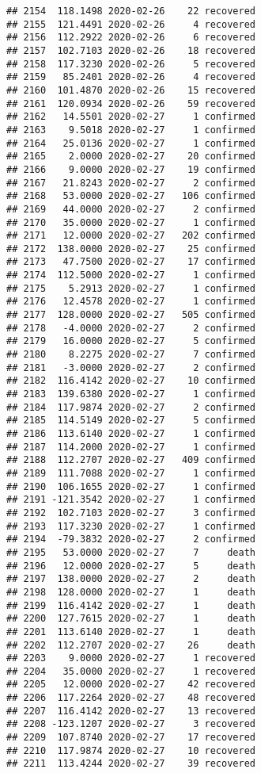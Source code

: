 \documentclass[
]{article}
\begin{document}
\begin{verbatim}
## 2154  118.1498 2020-02-26    22 recovered
## 2155  121.4491 2020-02-26     4 recovered
## 2156  112.2922 2020-02-26     6 recovered
## 2157  102.7103 2020-02-26    18 recovered
## 2158  117.3230 2020-02-26     5 recovered
## 2159   85.2401 2020-02-26     4 recovered
## 2160  101.4870 2020-02-26    15 recovered
## 2161  120.0934 2020-02-26    59 recovered
## 2162   14.5501 2020-02-27     1 confirmed
## 2163    9.5018 2020-02-27     1 confirmed
## 2164   25.0136 2020-02-27     1 confirmed
## 2165    2.0000 2020-02-27    20 confirmed
## 2166    9.0000 2020-02-27    19 confirmed
## 2167   21.8243 2020-02-27     2 confirmed
## 2168   53.0000 2020-02-27   106 confirmed
## 2169   44.0000 2020-02-27     2 confirmed
## 2170   35.0000 2020-02-27     1 confirmed
## 2171   12.0000 2020-02-27   202 confirmed
## 2172  138.0000 2020-02-27    25 confirmed
## 2173   47.7500 2020-02-27    17 confirmed
## 2174  112.5000 2020-02-27     1 confirmed
## 2175    5.2913 2020-02-27     1 confirmed
## 2176   12.4578 2020-02-27     1 confirmed
## 2177  128.0000 2020-02-27   505 confirmed
## 2178   -4.0000 2020-02-27     2 confirmed
## 2179   16.0000 2020-02-27     5 confirmed
## 2180    8.2275 2020-02-27     7 confirmed
## 2181   -3.0000 2020-02-27     2 confirmed
## 2182  116.4142 2020-02-27    10 confirmed
## 2183  139.6380 2020-02-27     1 confirmed
## 2184  117.9874 2020-02-27     2 confirmed
## 2185  114.5149 2020-02-27     5 confirmed
## 2186  113.6140 2020-02-27     1 confirmed
## 2187  114.2000 2020-02-27     1 confirmed
## 2188  112.2707 2020-02-27   409 confirmed
## 2189  111.7088 2020-02-27     1 confirmed
## 2190  106.1655 2020-02-27     1 confirmed
## 2191 -121.3542 2020-02-27     1 confirmed
## 2192  102.7103 2020-02-27     3 confirmed
## 2193  117.3230 2020-02-27     1 confirmed
## 2194  -79.3832 2020-02-27     2 confirmed
## 2195   53.0000 2020-02-27     7     death
## 2196   12.0000 2020-02-27     5     death
## 2197  138.0000 2020-02-27     2     death
## 2198  128.0000 2020-02-27     1     death
## 2199  116.4142 2020-02-27     1     death
## 2200  127.7615 2020-02-27     1     death
## 2201  113.6140 2020-02-27     1     death
## 2202  112.2707 2020-02-27    26     death
## 2203    9.0000 2020-02-27     1 recovered
## 2204   35.0000 2020-02-27     1 recovered
## 2205   12.0000 2020-02-27    42 recovered
## 2206  117.2264 2020-02-27    48 recovered
## 2207  116.4142 2020-02-27    13 recovered
## 2208 -123.1207 2020-02-27     3 recovered
## 2209  107.8740 2020-02-27    17 recovered
## 2210  117.9874 2020-02-27    10 recovered
## 2211  113.4244 2020-02-27    39 recovered

\end{verbatim}
\end{document}
